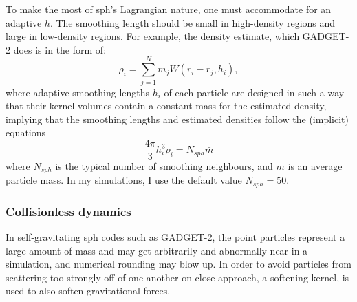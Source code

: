 To make the most of \ac{sph}'s Lagrangian nature, one must accommodate for an adaptive $h$. The smoothing length should be small in high-density regions and large in low-density regions. For example, the density estimate,  which GADGET-2 does is in the form of:
\begin{equation}
    \rho_i = \sum_{j=1}^{N} m_j W(r_i -r_j,h_i),
\end{equation}
where adaptive smoothing lengths $h_i$ of each particle are designed in such a way that their kernel volumes contain a constant mass for the estimated density, implying that the smoothing lengths and estimated densities follow the (implicit) equations
\begin{equation}
    \frac{4\pi}{3} h_{i}^3 \rho_i = N_{sph} \bar{m}
\end{equation}
where $N_{sph}$ is the typical number of smoothing neighbours, and $\bar{m}$ is an average particle mass. In my simulations, I use the default value $N_{sph}=50$. 

\subsubsection{Collisionless dynamics}

In self-gravitating \ac{sph} codes such as GADGET-2, the point particles represent a large amount of mass and may get arbitrarily and abnormally near in a simulation, and numerical rounding may blow up. In order to avoid particles from scattering too strongly off of one another on close approach, a softening kernel, is used to also soften gravitational forces. 

